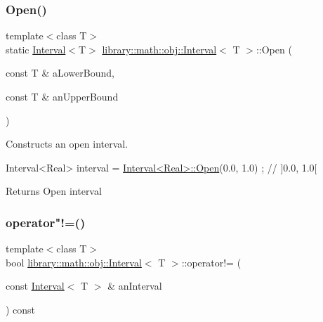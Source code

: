\subsubsection{\texorpdfstring{Open()}{Open()}}
{\footnotesize\ttfamily template$<$class T$>$ \\
static \hyperlink{classlibrary_1_1math_1_1obj_1_1_interval}{Interval}$<$T$>$ \hyperlink{classlibrary_1_1math_1_1obj_1_1_interval}{library\+::math\+::obj\+::\+Interval}$<$ T $>$\+::Open (\begin{DoxyParamCaption}\item[{const T \&}]{a\+Lower\+Bound,  }\item[{const T \&}]{an\+Upper\+Bound }\end{DoxyParamCaption})\hspace{0.3cm}{\ttfamily [static]}}



Constructs an open interval. 


\begin{DoxyCode}
Interval<Real> interval = \hyperlink{classlibrary_1_1math_1_1obj_1_1_interval_add0e1114a0c153da7a928fd059a08919}{Interval<Real>::Open}(0.0, 1.0) ; \textcolor{comment}{// ]0.0, 1.0[}
\end{DoxyCode}


\begin{DoxyReturn}{Returns}
Open interval 
\end{DoxyReturn}
\mbox{\label{classlibrary_1_1math_1_1obj_1_1_interval_a5ca4c08ba0aff1ea42ea3804d51e02cf}} 
\subsubsection{\texorpdfstring{operator"!=()}{operator!=()}}
{\footnotesize\ttfamily template$<$class T$>$ \\
bool \hyperlink{classlibrary_1_1math_1_1obj_1_1_interval}{library\+::math\+::obj\+::\+Interval}$<$ T $>$\+::operator!= (\begin{DoxyParamCaption}\item[{const \hyperlink{classlibrary_1_1math_1_1obj_1_1_interval}{Interval}$<$ T $>$ \&}]{an\+Interval }\end{DoxyParamCaption}) const}



